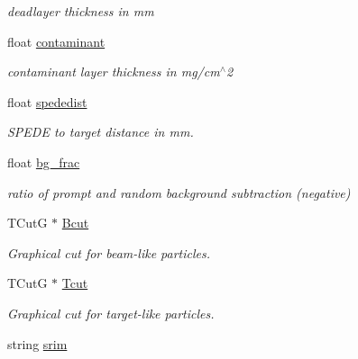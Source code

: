 \begin{DoxyCompactItemize}
\begin{DoxyCompactList}\small\item\em deadlayer thickness in mm \end{DoxyCompactList}\item 
\hypertarget{classg__clx_a9093a10412ab047b3b910e4c4a9d70d1}{float \hyperlink{classg__clx_a9093a10412ab047b3b910e4c4a9d70d1}{contaminant}}\label{classg__clx_a9093a10412ab047b3b910e4c4a9d70d1}

\begin{DoxyCompactList}\small\item\em contaminant layer thickness in mg/cm$^\wedge$2 \end{DoxyCompactList}\item 
\hypertarget{classg__clx_aca4cd80422665dab4188cbf82bb569ce}{float \hyperlink{classg__clx_aca4cd80422665dab4188cbf82bb569ce}{spededist}}\label{classg__clx_aca4cd80422665dab4188cbf82bb569ce}

\begin{DoxyCompactList}\small\item\em S\-P\-E\-D\-E to target distance in mm. \end{DoxyCompactList}\item 
\hypertarget{classg__clx_ad9d34b2f15cdb59de8b46f1f68280c5c}{float \hyperlink{classg__clx_ad9d34b2f15cdb59de8b46f1f68280c5c}{bg\-\_\-frac}}\label{classg__clx_ad9d34b2f15cdb59de8b46f1f68280c5c}

\begin{DoxyCompactList}\small\item\em ratio of prompt and random background subtraction (negative) \end{DoxyCompactList}\item 
\hypertarget{classg__clx_a626bb40b10360e2572d0c489a0cde2ad}{T\-Cut\-G $\ast$ \hyperlink{classg__clx_a626bb40b10360e2572d0c489a0cde2ad}{Bcut}}\label{classg__clx_a626bb40b10360e2572d0c489a0cde2ad}

\begin{DoxyCompactList}\small\item\em Graphical cut for beam-\/like particles. \end{DoxyCompactList}\item 
\hypertarget{classg__clx_a5607f06b4881cc2843fd2b9c9c16b35b}{T\-Cut\-G $\ast$ \hyperlink{classg__clx_a5607f06b4881cc2843fd2b9c9c16b35b}{Tcut}}\label{classg__clx_a5607f06b4881cc2843fd2b9c9c16b35b}

\begin{DoxyCompactList}\small\item\em Graphical cut for target-\/like particles. \end{DoxyCompactList}\item 
\hypertarget{classg__clx_a93a1356b136b6383340a9f5d3ae034f0}{string \hyperlink{classg__clx_a93a1356b136b6383340a9f5d3ae034f0}{srim}}\label{classg__clx_a93a1356b136b6383340a9f5d3ae034f0}


\end{DoxyCompactItemize}
